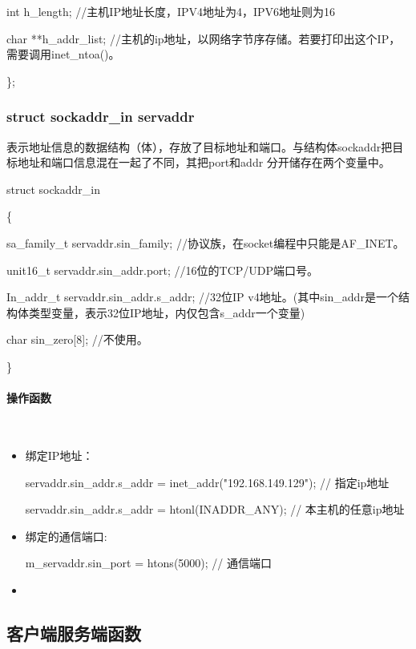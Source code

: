 \documentclass[UTF8]{article}%
\begin{document}
\qquad    int h\_length;  //主机IP地址长度，IPV4地址为4，IPV6地址则为16

\qquad    char **h\_addr\_list;  //主机的ip地址，以网络字节序存储。若要打印出这个IP，需要调用inet\_ntoa()。

\};


\subsubsection{struct sockaddr\_in servaddr}

表示地址信息的数据结构（体），存放了目标地址和端口。与结构体sockaddr把目标地址和端口信息混在一起了不同，其把port和addr 分开储存在两个变量中。

struct sockaddr\_in

\{

\qquad sa\_family\_t \quad servaddr.sin\_family; //协议族，在socket编程中只能是AF\_INET。

\qquad unit16\_t \quad servaddr.sin\_addr.port; //16位的TCP/UDP端口号。

\qquad In\_addr\_t \quad servaddr.sin\_addr.s\_addr; //32位IP v4地址。(其中sin\_addr是一个结构体类型变量，表示32位IP地址，内仅包含s\_addr一个变量)

\qquad char \quad sin\_zero[8]; //不使用。

\}

\paragraph{操作函数}~{}

\begin{itemize}
    \item 绑定IP地址：

    servaddr.sin\_addr.s\_addr = inet\_addr("192.168.149.129");  // 指定ip地址

    servaddr.sin\_addr.s\_addr = htonl(INADDR\_ANY);  // 本主机的任意ip地址

    \item 绑定的通信端口:
    
    m\_servaddr.sin\_port = htons(5000);  // 通信端口

    \item 
\end{itemize}

\subsection{客户端服务端函数}
\end{document}

